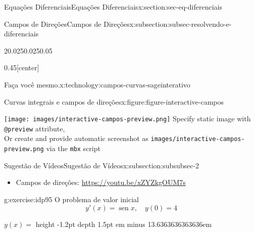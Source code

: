 \documentclass[oneside,10pt,]{article}
\newcommand{\mono}[1]{\texttt{#1}}
\newcommand{\fillin}[1]{\leavevmode\leaders\vrule height -1.2pt depth 1.5pt \hskip #1em minus #1em \null}
\numberwithin{equation}{section}
\newlength{\qrsize}
\newlength{\previewwidth}
\DeclareMathOperator{\sin}{sen}
\begin{document}
\begin{sectionptx}{Equações Diferenciais}{}{Equações Diferenciais}{}{}{x:section:sec-eq-diferenciais}
\begin{subsectionptx}{Campos de Direções}{}{Campos de Direções}{}{}{x:subsection:subsec-resolvendo-e-diferenciais}
\begin{sidebyside}{2}{0.025}{0.025}{0.05}
\begin{sbspanel}{0.45}[center]
\end{sbspanel}%
\end{sidebyside}%
\begin{technology}{Faça você mesmo.}{x:technology:campos-curvas-sageinterativo}%
\begin{figureptx}{Curvas integrais e campos de direções}{x:figure:figure-interactive-campos}{}%
\centering
\setlength{\qrsize}{9em}
\setlength{\previewwidth}{\linewidth}
\addtolength{\previewwidth}{-\qrsize}
\begin{tcbraster}[raster columns=2, raster column skip=1pt, raster halign=center, raster force size=false, raster left skip=0pt, raster right skip=0pt]%
\begin{tcolorbox}[previewstyle, width=\previewwidth]%
%
{\texttt{[image: images/interactive-campos-preview.png]}}%
{\small{}Specify static image with \mono{@preview} attribute,\\Or create and provide automatic screenshot as \mono{images/interactive-campos-preview.png} via the \mono{mbx} script}%
\end{tcolorbox}%
\begin{tcolorbox}[qrstyle]%
{\hypersetup{urlcolor=black}}%
\end{tcolorbox}%
\end{tcbraster}%
\tcblower
\end{figureptx}%
\end{technology}
\end{subsectionptx}
%
%
\typeout{************************************************}
\typeout{************************************************}
%
\begin{subsectionptx}{Sugestão de Vídeos}{}{Sugestão de Vídeos}{}{}{x:subsection:subsubsec-2}
%
\begin{itemize}[label=\textbullet]
\item{}Campos de direções: \url{https://youtu.be/xZYZkgOUM7s}%
\end{itemize}
\end{subsectionptx}
\begin{inlineexercise}{}{g:exercise:idp95}%
O problema de valor inicial%
\begin{equation*}
y'(x) = \sin x, \quad y(0) = 4
\end{equation*}
%
\par
\(y(x) =\) \fillin{13.6363636363636}%
\par\smallskip%

\end{inlineexercise}
\end{sectionptx}
\end{document}
